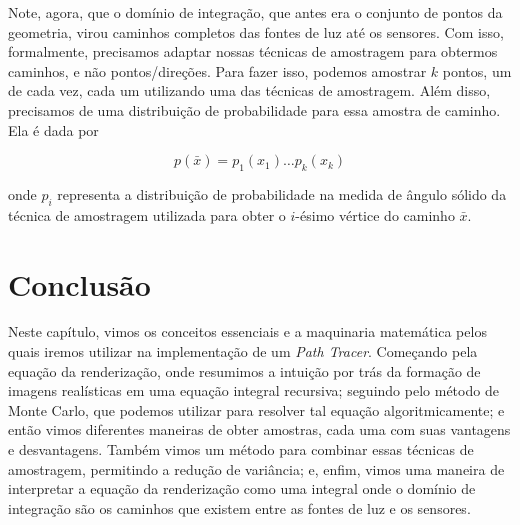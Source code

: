 Note, agora, que o domínio de integração, que antes era o conjunto de pontos da
geometria, virou caminhos completos das fontes de luz até os sensores. Com isso,
formalmente, precisamos adaptar nossas técnicas de amostragem para obtermos
caminhos, e não pontos/direções. Para fazer isso, podemos amostrar $k$ pontos,
um de cada vez, cada um utilizando uma das técnicas de amostragem. Além disso,
precisamos de uma distribuição de probabilidade para essa amostra de caminho.
Ela é dada por

\[
  p(\bar{x}) = p_1(x_1) \ldots p_k(x_k)
\]

onde $p_i$ representa a distribuição de probabilidade na medida de ângulo
sólido da técnica de amostragem utilizada para obter o $i$-ésimo vértice do
caminho $\bar{x}$.

\section{Conclusão}

Neste capítulo, vimos os conceitos essenciais e a maquinaria matemática pelos
quais iremos utilizar na implementação de um \emph{Path Tracer}. Começando pela
equação da renderização, onde resumimos a intuição por trás da formação de
imagens realísticas em uma equação integral recursiva; seguindo pelo método de
Monte Carlo, que podemos utilizar para resolver tal equação algoritmicamente; e
então vimos diferentes maneiras de obter amostras, cada uma com suas vantagens e
desvantagens. Também vimos um método para combinar essas técnicas de amostragem,
permitindo a redução de variância; e, enfim, vimos uma maneira de interpretar a
equação da renderização como uma integral onde o domínio de integração são os
caminhos que existem entre as fontes de luz e os sensores.
